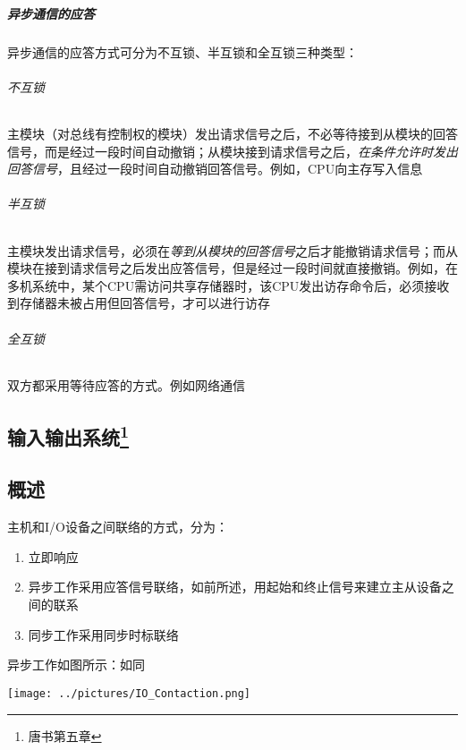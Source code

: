 \documentclass[]{report}
\begin{document}
				\paragraph{异步通信的应答} 异步通信的应答方式可分为不互锁、半互锁和全互锁三种类型：
				\subparagraph{不互锁}主模块（对总线有控制权的模块）发出请求信号之后，不必等待接到从模块的回答信号，而是经过一段时间自动撤销；从模块接到请求信号之后，\textit{在条件允许时发出回答信号}，且经过一段时间自动撤销回答信号。例如，CPU向主存写入信息
				\subparagraph{半互锁}主模块发出请求信号，必须在\textit{等到从模块的回答信号}之后才能撤销请求信号；而从模块在接到请求信号之后发出应答信号，但是经过一段时间就直接撤销。例如，在多机系统中，某个CPU需访问共享存储器时，该CPU发出访存命令后，必须接收到存储器未被占用但回答信号，才可以进行访存
				\subparagraph{全互锁}双方都采用等待应答的方式。例如网络通信

	\begin{center}
		\chapter[]{输入输出系统\footnote{唐书第五章}}
	\end{center}
		\section{概述}
			主机和I/O设备之间联络的方式，分为：\par
			\begin{enumerate}[label = (\arabic{*})]
				\item 立即响应
				\item 异步工作采用应答信号联络，如前所述，用起始和终止信号来建立主从设备之间的联系
				\item 同步工作采用同步时标联络
			\end{enumerate}
			异步工作如图所示：如同\par
			\texttt{[image: ../pictures/IO\_Contaction.png]}\par
\end{document}
